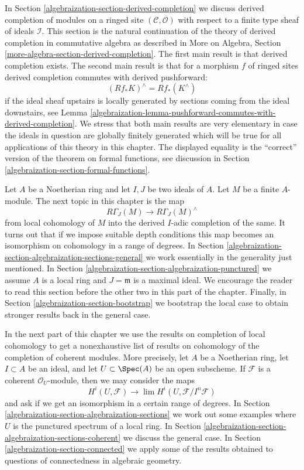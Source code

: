 \medskip\noindent
In Section \ref{algebraization-section-derived-completion} we discuss derived completion
of modules on a ringed site $(\mathcal{C}, \mathcal{O})$
with respect to a finite type sheaf of ideals $\mathcal{I}$.
This section is the natural continuation of the theory of derived completion
in commutative algebra as described in
More on Algebra, Section \ref{more-algebra-section-derived-completion}.
The first main result is that derived completion exists.
The second main result is that for a morphism $f$ of ringed sites
derived completion commutes with derived pushforward:
$$
(Rf_*K)^\wedge = Rf_*(K^\wedge)
$$
if the ideal sheaf upstairs is locally generated by sections coming
from the ideal downstairs, see
Lemma \ref{algebraization-lemma-pushforward-commutes-with-derived-completion}.
We stress that both main results are very elementary in case the
ideals in question are globally finitely generated which will
be true for all applications of this theory in this chapter.
The displayed equality is the ``correct'' version of the
theorem on formal functions, see discussion in
Section \ref{algebraization-section-formal-functions}.

\medskip\noindent
Let $A$ be a Noetherian ring and let $I, J$ be two ideals of $A$.
Let $M$ be a finite $A$-module.
The next topic in this chapter is the map
$$
R\Gamma_J(M) \longrightarrow R\Gamma_J(M)^\wedge
$$
from local cohomology of $M$ into the derived $I$-adic completion
of the same. It turns out that if we impose suitable depth conditions
this map becomes an isomorphism on cohomology in a range of degrees.
In Section \ref{algebraization-section-algebraization-sections-general}
we work essentially in the generality just mentioned.
In Section \ref{algebraization-section-algebraization-punctured}
we assume $A$ is a local ring and $J = \mathfrak m$ is a maximal ideal.
We encourage the reader to read this section before the other two in
this part of the chapter.
Finally, in Section \ref{algebraization-section-bootstrap} we bootstrap
the local case to obtain stronger results back in the general case.

\medskip\noindent
In the next part of this chapter we use the results on
completion of local cohomology to get a nonexhaustive list of results on
cohomology of the completion of coherent modules.
More precisely, let $A$ be a Noetherian ring, let $I \subset A$
be an ideal, and let $U \subset \Spec(A)$ be an open subscheme.
If $\mathcal{F}$ is a coherent $\mathcal{O}_U$-module, then
we may consider the maps
$$
H^i(U, \mathcal{F}) \longrightarrow \lim H^i(U, \mathcal{F}/I^n\mathcal{F})
$$
and ask if we get an isomorphism in a certain range of degrees.
In Section \ref{algebraization-section-algebraization-sections}
we work out some examples where $U$ is the punctured spectrum
of a local ring. In Section \ref{algebraization-section-algebraization-sections-coherent}
we discuss the general case.
In Section \ref{algebraization-section-connected} we apply some of the results
obtained to questions of connectedness in algebraic geometry.

